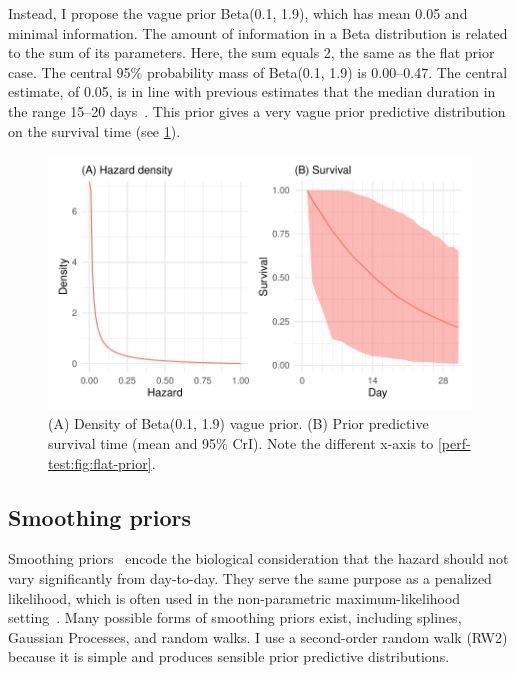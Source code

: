\documentclass[thesis.tex]{subfiles}
\begin{document}
Instead, I propose the vague prior Beta(0.1, 1.9), which has mean 0.05 and minimal information.
The amount of information in a Beta distribution is related to the sum of its parameters.
Here, the sum equals 2, the same as the flat prior case.
The central 95\% probability mass of Beta(0.1, 1.9) is 0.00--0.47.
The central estimate, of 0.05, is in line with previous estimates that the median duration in the range 15--20 days~\autocite{cevikShedding}.
This prior gives a very vague prior predictive distribution on the survival time (see \cref{perf-test:fig:vague-prior}).
\begin{figure}
  \centering \includegraphics{cis-perfect-testing/vague-prior}
  \caption[Vague prior for the hazard]{
    (A) Density of Beta(0.1, 1.9) vague prior.
    (B) Prior predictive survival time (mean and 95\% CrI).
    Note the different x-axis to \cref{perf-test:fig:flat-prior}.
  }
  \label{perf-test:fig:vague-prior}
\end{figure}


\subsection{Smoothing priors}

Smoothing priors~\autocite{gerschSmoothness} encode the biological consideration that the hazard should not vary significantly from day-to-day.
They serve the same purpose as a penalized likelihood, which is often used in the non-parametric maximum-likelihood setting~\autocite[e.g.][]{bacchettiNonparametric}.
Many possible forms of smoothing priors exist, including splines, Gaussian Processes, and random walks.
I use a second-order random walk (RW2) because it is simple and produces sensible prior predictive distributions.
\end{document}
